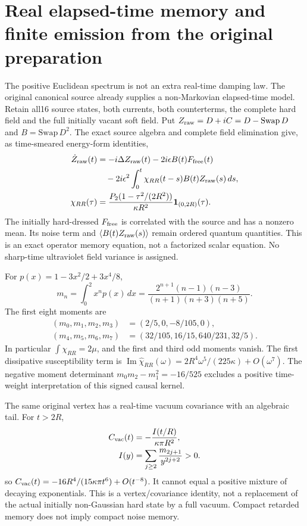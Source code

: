\section{Real elapsed-time memory and finite emission from the original preparation}
\label{sec:composition6-realtime}
The positive Euclidean spectrum is not an extra real-time damping law.
The original canonical source already supplies a non-Markovian elapsed-time
model. Retain all16 source states, both currents, both counterterms, the
complete hard field and the full initially vacant soft field. Put
\(Z_{\rm raw}=D+iC=D-\mathrm{Swap}\,D\) and
\(B=\mathrm{Swap}\,D^2\). The exact source algebra and complete field
elimination give, as time-smeared energy-form identities,
\begin{align}
 \dot Z_{\rm raw}(t)&=-i\Delta Z_{\rm raw}(t)
       -2i\epsilon B(t)F_{\rm free}(t)\nonumber\\
 &\quad-2i\epsilon^2\int_0^t\chi_{RR}(t-s)
                               B(t)Z_{\rm raw}(s)\,ds,\label{eq:composition6-memory}\\
 \chi_{RR}(\tau)&=\frac{P_2(1-\tau^2/(2R^2))}{\kappa R^2}
                        \boldsymbol{1}_{(0,2R)}(\tau).
\end{align}
The initially hard-dressed \(F_{\rm free}\) is correlated with the source
and has a nonzero mean. Its noise term and
\(\langle B(t)Z_{\rm raw}(s)\rangle\) remain ordered quantum quantities.
This is an exact operator memory equation, not a factorized scalar equation.
No sharp-time ultraviolet field variance is assigned.

For \(p(x)=1-3x^2/2+3x^4/8\),
\begin{equation}
 m_n=\int_0^2x^np(x)\,dx
 =\frac{2^{n+1}(n-1)(n-3)}{(n+1)(n+3)(n+5)}.
\end{equation}
The first eight moments are
\begin{align*}
 (m_0,m_1,m_2,m_3)&=(2/5,0,-8/105,0),\\
 (m_4,m_5,m_6,m_7)&=(32/105,16/15,640/231,32/5).
\end{align*}
In particular \(\int\chi_{RR}=2\mu\), and the first and third odd
moments vanish. The first dissipative susceptibility term is
\(\operatorname{Im}\widehat\chi_{RR}(\omega)
=2R^4\omega^5/(225\kappa)+O(\omega^7)\).
The negative moment determinant \(m_0m_2-m_1^2=-16/525\) excludes a
positive time-weight interpretation of this signed causal kernel.

The same original vertex has a real-time vacuum covariance with an
algebraic tail. For \(t>2R\),
\begin{align}
 C_{\rm vac}(t)&=-\frac{I(t/R)}{\kappa\pi R^2},\nonumber\\
 I(y)&=\sum_{j\ge2}\frac{m_{2j+1}}{y^{2j+2}}>0.
\end{align}
so \(C_{\rm vac}(t)=-16R^4/(15\kappa\pi t^6)+O(t^{-8})\).
It cannot equal a positive mixture of decaying exponentials. This is a
vertex/covariance identity, not a replacement of the actual initially
non-Gaussian hard state by a full vacuum. Compact retarded memory does not
imply compact noise memory.

